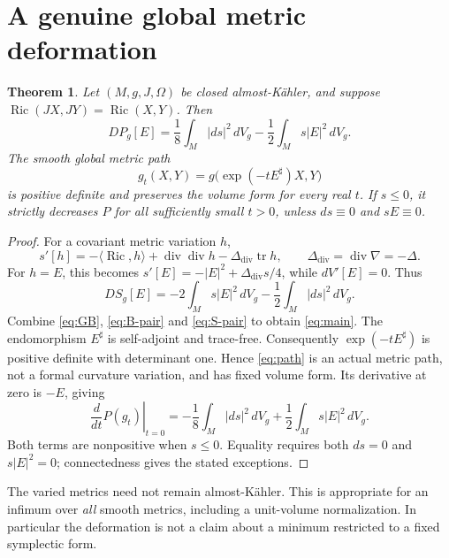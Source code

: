\documentclass[11pt]{article}
\newcommand{\Ric}{\operatorname{Ric}}
\newcommand{\tr}{\operatorname{tr}}
\newcommand{\diver}{\operatorname{div}}
\newcommand{\dd}{\,dV_g}
\newtheorem{theorem}{Theorem}
\theoremstyle{remark}
\begin{document}
\section{A genuine global metric deformation}

\begin{theorem}\label{thm:descent}
Let $(M,g,J,\Omega)$ be closed almost-K\"ahler, and suppose
$\Ric(JX,JY)=\Ric(X,Y)$. Then
\begin{equation}
 \boxed{DP_g[E]=\frac18\int_M|ds|^2\dd
                    -\frac12\int_Ms|E|^2\dd.}
 \label{eq:main}
\end{equation}
The smooth global metric path
\begin{equation}
 g_t(X,Y)=g\bigl(\exp(-tE^\sharp)X,Y\bigr)
 \label{eq:path}
\end{equation}
is positive definite and preserves the volume form for every real $t$.
If $s\le0$, it strictly decreases $P$ for all sufficiently small $t>0$,
unless $ds\equiv0$ and $sE\equiv0$.
\end{theorem}

\begin{proof}
For a covariant metric variation $h$,
\[
 s'[h]=-\langle\Ric,h\rangle
       +\diver\diver h-\Delta_{\mathrm{div}}\tr h,
 \qquad \Delta_{\mathrm{div}}=\diver\nabla=-\Delta.
\]
For $h=E$, this becomes
$s'[E]=-|E|^2+\Delta_{\mathrm{div}}s/4$, while
$dV'[E]=0$. Thus
\begin{equation}
 DS_g[E]=-2\int_Ms|E|^2\dd-\frac12\int_M|ds|^2\dd.
 \label{eq:S-pair}
\end{equation}
Combine \eqref{eq:GB}, \eqref{eq:B-pair} and \eqref{eq:S-pair} to obtain
\eqref{eq:main}. The endomorphism $E^\sharp$ is self-adjoint and
trace-free. Consequently $\exp(-tE^\sharp)$ is positive definite with
determinant one. Hence \eqref{eq:path} is an actual metric path, not
a formal curvature variation, and has fixed volume form. Its derivative
at zero is $-E$, giving
\begin{equation}
 \left.\frac{d}{dt}P(g_t)\right|_{t=0}
 =-\frac18\int_M|ds|^2\dd+\frac12\int_Ms|E|^2\dd.
 \label{eq:negative}
\end{equation}
Both terms are nonpositive when $s\le0$. Equality requires both
$ds=0$ and $s|E|^2=0$; connectedness gives the stated exceptions.
\end{proof}

The varied metrics need not remain almost-K\"ahler. This is appropriate
for an infimum over \emph{all} smooth metrics, including a unit-volume
normalization. In particular the deformation is not a claim about a
minimum restricted to a fixed symplectic form.
\end{document}
